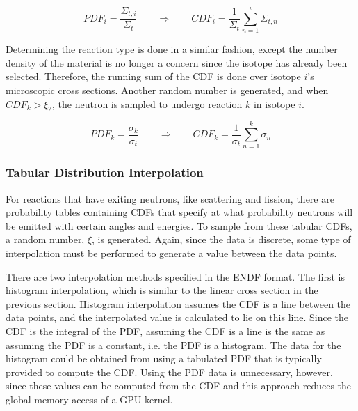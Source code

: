 \begin{equation}
\label{isotope_selection}
PDF_i = \frac{\Sigma_{t,i}}{\Sigma_t} \qquad \Rightarrow \qquad CDF_i = \frac{1}{\Sigma_t } \sum_{n=1}^i \Sigma_{t,n}
\end{equation}

Determining the reaction type is done in a similar fashion, except the number density of the material is no longer a concern since the isotope has already been selected.  Therefore, the running sum of the CDF is done over isotope $i$'s microscopic cross sections.  Another random number is generated, and when $CDF_k > \xi_2$, the neutron is sampled to undergo reaction $k$ in isotope $i$.

\begin{equation}
\label{reaction_selection}
PDF_k = \frac{\sigma_k}{\sigma_t} \qquad \Rightarrow \qquad CDF_k = \frac{1}{\sigma_{t} } \sum_{n=1}^k \sigma_{n}
\end{equation}


\subsubsection{Tabular Distribution Interpolation}

For reactions that have exiting neutrons, like scattering and fission, there are probability tables containing CDFs that specify at what probability neutrons will be emitted with certain angles and energies.  To sample from these tabular CDFs, a random number, $\xi$, is generated.  Again, since the data is discrete, some type of interpolation must be performed to generate a value between the data points.  

There are two interpolation methods specified in the ENDF format.  The first is histogram interpolation, which is similar to the linear cross section in the previous section.  Histogram interpolation assumes the CDF is a line between the data points, and the interpolated value is calculated to lie on this line.  Since the CDF is the integral of the PDF, assuming the CDF is a line is the same as assuming the PDF is a constant, i.e. the PDF is a histogram.  The data for the histogram could be obtained from using a tabulated PDF that is typically provided to compute the CDF.  Using the PDF data is unnecessary, however, since these values can be computed from the CDF and this approach reduces the global memory access of a GPU kernel. 


